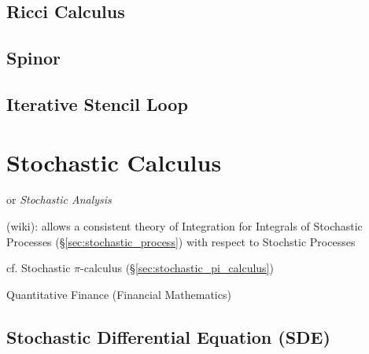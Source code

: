 {%
\subsection{Ricci Calculus}\label{sec:ricci_calculus}

\subsection{Spinor}\label{sec:spinor}

\subsection{Iterative Stencil Loop}\label{sec:iterative_stencil}





\section{Stochastic Calculus}\label{sec:stochastic_calculus}


or \emph{Stochastic Analysis}

(wiki): allows a consistent theory of Integration for Integrals of Stochastic
Processes (\S\ref{sec:stochastic_process}) with respect to Stochstic Processes

cf. Stochastic $\pi$-calculus (\S\ref{sec:stochastic_pi_calculus})

Quantitative Finance (Financial Mathematics)



\subsection{Stochastic Differential Equation (SDE)}\label{sec:sde}

}
